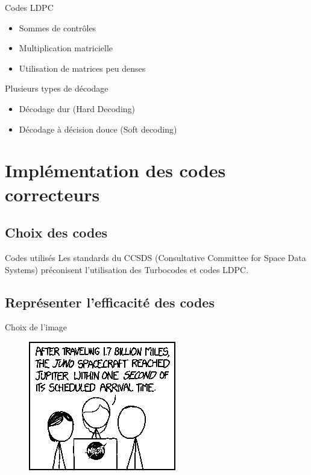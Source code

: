\documentclass[11pt]{beamer}
\begin{document}
\begin{frame}{Codes LDPC}
	\begin{itemize}
		\item Sommes de contrôles
		\item Multiplication matricielle
		\item Utilisation de matrices peu denses
	\end{itemize}
\end{frame}

\begin{frame}{Plusieurs types de d\'ecodage}
	\begin{itemize}
		\item D\'ecodage dur (Hard Decoding)
		\item D\'ecodage \`a d\'ecision douce (Soft decoding)
	\end{itemize}
\end{frame}


\section{Impl\'ementation des codes correcteurs}
\subsection{Choix des codes}


\begin{frame}{Codes utilis\'es}
	Les standards du CCSDS (Consultative Committee for Space Data Systems) pr\'econisent l'utilisation des Turbocodes et codes LDPC.
\end{frame}


\subsection{Repr\'esenter l'efficacit\'e des codes}


\begin{frame}{Choix de l'image}
	\begin{figure}
		\includegraphics[scale=0.9]{base}
	\end{figure}
\end{frame}
\end{document}

